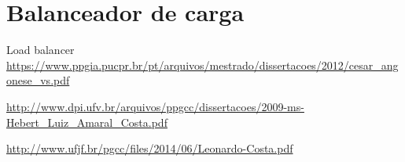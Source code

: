 \part{Balanceador de carga}

Load balancer \url{https://www.ppgia.pucpr.br/pt/arquivos/mestrado/dissertacoes/2012/cesar_angonese_vs.pdf}

\url{http://www.dpi.ufv.br/arquivos/ppgcc/dissertacoes/2009-ms-Hebert_Luiz_Amaral_Costa.pdf}

\url{http://www.ufjf.br/pgcc/files/2014/06/Leonardo-Costa.pdf}
